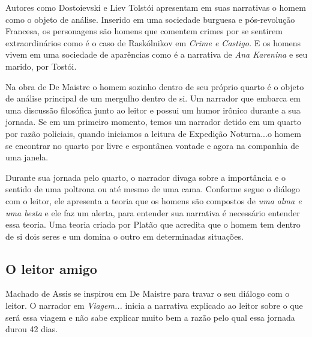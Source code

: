 \documentclass[12pt]{extarticle}
\begin{document}
Autores como Dostoievski e Liev Tolstói apresentam em suas narrativas o
homem como o objeto de análise. Inserido em uma sociedade burguesa e
pós-revolução Francesa, os personagens são homens que comentem crimes
por se sentirem extraordinários como é o caso de Raskólnikov em
\emph{Crime e Castigo.} E os homens vivem em uma sociedade de aparências
como é a narrativa de \emph{Ana Karenina} e seu marido, por Tostói.






Na obra de De Maistre o homem sozinho dentro de seu próprio quarto é o
objeto de análise principal de um mergulho dentro de si. Um narrador que
embarca em uma discussão filosófica junto ao leitor e possui um humor
irônico durante a sua jornada. Se em um primeiro momento, temos um
narrador detido em um quarto por razão policiais, quando iniciamos a
leitura de Expedição Noturna...o homem se encontrar no quarto por livre
e espontânea vontade e agora na companhia de uma janela.

Durante sua jornada pelo quarto, o narrador divaga sobre a importância e
o sentido de uma poltrona ou até mesmo de uma cama. Conforme segue o
diálogo com o leitor, ele apresenta a teoria que os homens são compostos
de \emph{uma alma e uma besta} e ele faz um alerta, para entender sua
narrativa é necessário entender essa teoria. Uma teoria criada por
Platão que acredita que o homem tem dentro de si dois seres e um domina
o outro em determinadas situações.

\subsection{O leitor amigo}

Machado de Assis se inspirou em De Maistre para travar o seu diálogo com
o leitor. O narrador em \emph{Viagem...} inicia a narrativa explicado ao
leitor sobre o que será essa viagem e não sabe explicar muito bem a
razão pelo qual essa jornada durou 42 dias.
\end{document}
